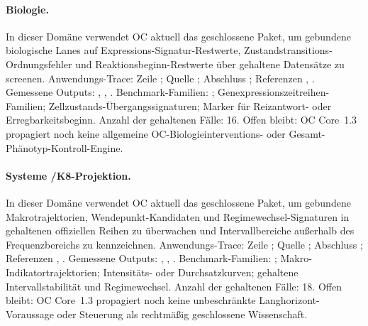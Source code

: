 \paragraph{Biologie.}
In dieser Domäne verwendet OC aktuell das geschlossene Paket, um gebundene biologische Lanes auf Expressions-Signatur-Restwerte, Zustandstransitions-Ordnungsfehler und Reaktionsbeginn-Restwerte über gehaltene Datensätze zu screenen.
Anwendungs-Trace: Zeile ; \allowbreak Quelle ; \allowbreak Abschluss ; \allowbreak Referenzen , \allowbreak {}.
Gemessene Outputs: , , .
Benchmark-Familien: ; Genexpressionszeitreihen-Familien; Zellzustands-\allowbreak Übergangssignaturen; Marker für Reizantwort- oder Erregbarkeitsbeginn.
Anzahl der gehaltenen Fälle: 16.
Offen bleibt: OC Core~1.3 propagiert noch keine allgemeine OC-Biologieinterventions- oder Gesamt-Phänotyp-Kontroll-Engine.

\paragraph{Systeme /\allowbreak K8-Projektion.}
In dieser Domäne verwendet OC aktuell das geschlossene Paket, um gebundene Makrotrajektorien, Wendepunkt-Kandidaten und Regimewechsel-Signaturen in gehaltenen offiziellen Reihen zu überwachen und Intervallbereiche außerhalb des Frequenzbereichs zu kennzeichnen.
Anwendungs-Trace: Zeile ; \allowbreak Quelle ; \allowbreak Abschluss ; \allowbreak Referenzen , \allowbreak {}.
Gemessene Outputs: , , .
Benchmark-Familien: ; Makro-Indikatortrajektorien; Intensitäts- oder Durchsatzkurven; gehaltene Intervallstabilität und Regimewechsel.
Anzahl der gehaltenen Fälle: 18.
Offen bleibt: OC Core~1.3 propagiert noch keine unbeschränkte Langhorizont-Voraussage oder Steuerung als rechtmäßig geschlossene Wissenschaft.

